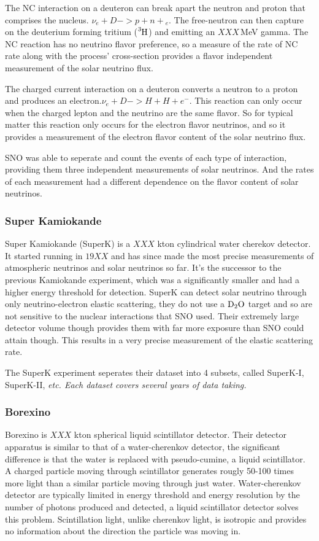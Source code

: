 The NC interaction on a deuteron can break apart the neutron and proton
that comprises the nucleus. $\nu_{e} + D -> p + n + $\nu$_{e}$.
The free-neutron can then capture on the deuterium forming tritium ($\ce{^{3}H}$)
and emitting an $XXX$\,MeV gamma. %
The NC reaction has no neutrino flavor preference, so a measure of the rate
of NC rate along with the process' cross-section provides a flavor independent
measurement of the solar neutrino flux.

The charged current interaction on a deuteron converts a neutron to a
proton and produces an electron.$\nu_{e} + D -> H + H + e^{-}$.
This reaction can only occur when the charged lepton and the neutrino are the same
flavor. So for typical matter this reaction only occurs for the electron flavor
neutrinos, and so it provides a measurement of the electron flavor content
of the solar neutrino flux.

SNO was able to seperate and count the events of each type of interaction,
providing them three independent measurements of solar neutrinos. And
the rates of each measurement had a different dependence on the flavor content
of solar neutrinos.


\subsubsection{Super Kamiokande}
Super Kamiokande (SuperK) is a $XXX$ kton cylindrical water cherekov detector.
It started running in $19XX$ and has since made the most precise measurements of
atmospheric neutrinos and solar neutrinos so far.
It's the successor to the previous Kamiokande experiment, which was a significantly
smaller and had a higher energy threshold for detection.
SuperK can detect solar neutrino through only neutrino-electron elastic scattering,
they do not use a $\ce{D_{2}O}$ target and so are not sensitive to the
nuclear interactions that SNO used.
Their extremely large detector volume though provides them with far more exposure
than SNO could attain though. This results in a very precise measurement of the
elastic scattering rate.

The SuperK experiment seperates their dataset into 4 subsets, called
SuperK-I, SuperK-II, \it{etc}. %
Each dataset covers several years of data taking.

\subsubsection{Borexino}
Borexino is $XXX$ kton spherical liquid scintillator detector. Their detector
apparatus is similar to that of a water-cherenkov detector, the significant difference
is that the water is replaced with pseudo-cumine, a liquid scintillator.
A charged particle moving through scintillator generates rougly 50-100 times
more light than a similar particle moving through just water.
Water-cherenkov detector are typically limited in energy threshold
and energy resolution by the number of photons produced and detected, a liquid scintillator
detector solves this problem.  Scintillation light, unlike cherenkov light,
is isotropic and provides no information about the direction the particle
was moving in.

